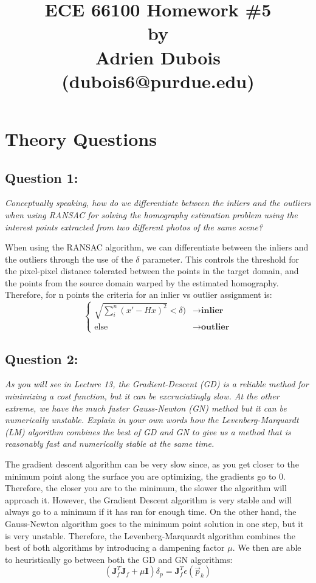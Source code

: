 \documentclass{article}
\title{\Large \textbf{ECE 66100 Homework \#5\\[0.1in] by\\ [0.1in] Adrien Dubois (dubois6@purdue.edu)}}
\begin{document}
\maketitle
\tableofcontents

\section{Theory Questions}
\subsection{Question 1:}
\textit{Conceptually speaking, how do we differentiate between the inliers and the outliers when using
RANSAC for solving the homography estimation problem using the interest points extracted from
two different photos of the same scene?}

When using the RANSAC algorithm, we can differentiate between the inliers and the outliers through the use of the $\delta$ parameter. This controls the threshold for the pixel-pixel distance tolerated between the points in the target domain, and the points from the source domain warped by the estimated homography. Therefore, for n points the criteria for an inlier vs outlier assignment is:
\[\begin{cases}
\sqrt{\sum_i^n (x' - Hx)^2} < \delta) & \rightarrow  \textbf{inlier}\\
\text{else} & \rightarrow  \textbf{outlier}
\end{cases}
\]

\subsection{Question 2:}\label{sec:LM-question2}
\textit{As you will see in Lecture 13, the Gradient-Descent (GD) is a reliable method for minimizing a
cost function, but it can be excruciatingly slow. At the other extreme, we have the much faster
Gauss-Newton (GN) method but it can be numerically unstable. Explain in your own words how the
Levenberg-Marquardt (LM) algorithm combines the best of GD and GN to give us a method that is
reasonably fast and numerically stable at the same time.}

The gradient descent algorithm can be very slow since, as you get closer to the minimum point along the surface you are optimizing, the gradients go to 0. Therefore, the closer you are to the minimum, the slower the algorithm will approach it. However, the Gradient Descent algorithm is very stable and will always go to a minimum if it has ran for enough time. On the other hand, the Gauss-Newton algorithm goes to the minimum point solution in one step, but it is very unstable. Therefore, the Levenberg-Marquardt algorithm combines the best of both algorithms by introducing a dampening factor $\mu$. We then are able to heuristically go between both the GD and GN algorithms:
\[\left( \boldsymbol{J}_f^T \boldsymbol{J}_f + \mu \boldsymbol{I} \right) \delta_p= \boldsymbol{J}_f^T \epsilon (\Vec{p}_k)\]
\end{document}
